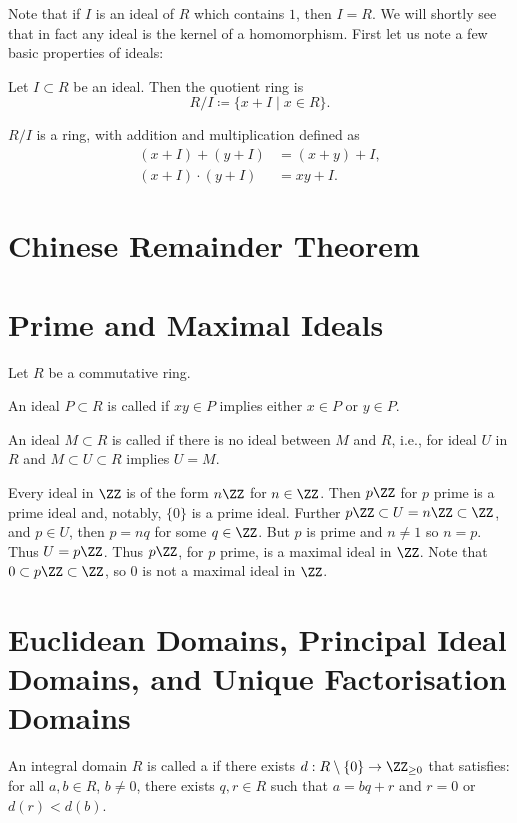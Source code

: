 Note that if $I$ is an ideal of $R$ which contains $1$, then $I=R$. We will shortly see that in fact any ideal is the kernel of a homomorphism. First let us note a few basic properties of ideals:



\begin{definition}
Let $I\subset R$ be an ideal. Then the quotient ring is
\[R/I\coloneqq\{x+I\mid x\in R\}.\]
\end{definition}

\begin{lemma}
$R/I$ is a ring, with addition and multiplication defined as
\begin{align*}
(x+I)+(y+I)&=(x+y)+I,\\
(x+I)\cdot(y+I)&=xy+I.
\end{align*}
\end{lemma}



\section{Chinese Remainder Theorem}
\section{Prime and Maximal Ideals}
Let $R$ be a commutative ring.

\begin{definition}
An ideal $P\subset R$ is called  if $xy\in P$ implies either $x\in P$ or $y\in P$.

An ideal $M\subset R$ is called  if there is no ideal between $M$ and $R$, i.e., for ideal $U$ in $R$ and $M\subset U\subset R$ implies $U=M$.
\end{definition}

\begin{example}
Every ideal in $\ZZ$ is of the form $n\ZZ$ for $n\in\ZZ$. Then $p\ZZ$ for $p$ prime is a prime ideal and, notably, $\{0\}$ is a prime ideal. Further $p\ZZ\subset U=n\ZZ\subset\ZZ$, and $p\in U$, then $p=nq$ for some $q\in\ZZ$. But $p$ is prime and $n\neq1$ so $n=p$. Thus $U=p\ZZ$. Thus $p\ZZ$, for $p$ prime, is a maximal ideal in $\ZZ$. Note that $0\subset p\ZZ\subset\ZZ$, so $0$ is not a maximal ideal in $\ZZ$.
\end{example}



\section{Euclidean Domains, Principal Ideal Domains, and Unique Factorisation Domains}
\begin{definition}
An integral domain $R$ is called a  if there exists $d:R\setminus\{0\}\to\ZZ_{\ge0}$ that satisfies: for all $a,b\in R$, $b\neq0$, there exists $q,r\in R$ such that $a=bq+r$ and $r=0$ or $d(r)<d(b)$.
\end{definition}

